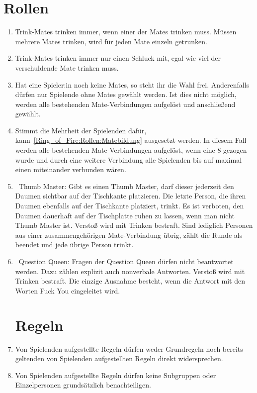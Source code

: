\section{Rollen}
\begin{enumerate}[label={(\arabic*)}]
	\item
	Trink-Mates trinken immer, wenn einer der Mates trinken muss.
	Müssen mehrere Mates trinken, wird für jeden Mate einzeln getrunken.
	
	\item
	Trink-Mates trinken immer nur einen Schluck mit, egal wie viel der verschuldende Mate trinken muss.

	\item\label{Ring_of_Fire:Rollen:Matebildung}
	Hat eine Spieler:in noch keine Mates, so steht ihr die Wahl frei.
	Anderenfalls dürfen nur Spielende ohne Mates gewählt werden.
	Ist dies nicht möglich, werden alle bestehenden Mate-Verbindungen aufgelöst und anschließend gewählt.
	
	\item
	Stimmt die Mehrheit der Spielenden dafür, kann~\ref{Ring_of_Fire:Rollen:Matebildung} ausgesetzt werden.
	In diesem Fall werden alle bestehenden Mate-Verbindungen aufgelöst, wenn eine 8 gezogen wurde und durch eine weitere Verbindung alle Spielenden bis auf maximal einen miteinander verbunden wären.
	
	\item\label{Ring_of_Fire:Rollen:Thumb_Master}
~\glqq{}Thumb Master\grqq{}: Gibt es einen Thumb Master, darf dieser jederzeit den Daumen sichtbar auf der Tischkante platzieren.
	Die letzte Person, die ihren Daumen ebenfalls auf der Tischkante platziert, trinkt.
	Es ist verboten, den Daumen dauerhaft auf der Tischplatte ruhen zu lassen, wenn man nicht Thumb Master ist.
	Verstoß wird mit Trinken bestraft.
	Sind lediglich Personen aus einer zusammengehörigen Mate-Verbindung übrig, zählt die Runde als beendet und jede übrige Person trinkt.
	
	\item\label{Ring_of_Fire:Rollen:Question_Queen}
~\glqq{}Question Queen\grqq{}: Fragen der Question Queen dürfen nicht beantwortet werden.
	Dazu zählen explizit auch nonverbale Antworten. Verstoß wird mit Trinken bestraft.
	Die einzige Ausnahme besteht, wenn die Antwort mit den Worten \glqq{}Fuck You\grqq{} eingeleitet wird.

\section{Regeln}\label{Ring_of_Fire:Regeln}
	\item
	Von Spielenden aufgestellte Regeln dürfen weder Grundregeln noch bereits geltenden von Spielenden aufgestellten Regeln direkt widersprechen.
	
	\item
	Von Spielenden aufgestellte Regeln dürfen keine Subgruppen oder Einzelpersonen grundsätzlich benachteiligen.
\end{enumerate}
